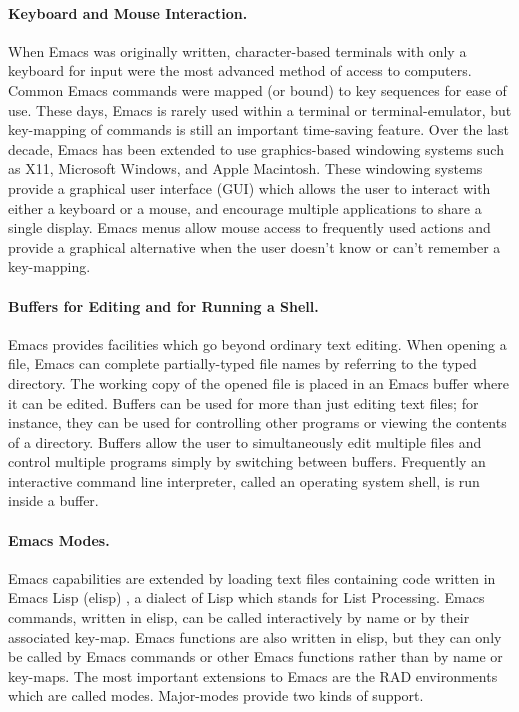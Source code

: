 \documentclass{article}
\begin{document}
\paragraph{Keyboard and Mouse Interaction.}
When Emacs was originally written, character-based terminals with only
a keyboard for input were the most advanced method of access to
computers.  Common Emacs commands were mapped (or bound) to key
sequences for ease of use.  These days, Emacs is
rarely used within a terminal or terminal-emulator, but key-mapping of
commands is still an important time-saving feature.  Over the last
decade, Emacs has been extended to use graphics-based windowing
systems such as X11, Microsoft Windows, and Apple Macintosh.  These
windowing systems provide a graphical user interface (GUI) which
allows the user to interact with either a keyboard or a mouse, and 
encourage multiple applications to share a single display.  Emacs 
menus allow mouse access to frequently used actions and provide a 
graphical alternative when the user doesn't know or can't remember 
a key-mapping.  

\paragraph{Buffers for Editing and for Running a Shell.}
Emacs provides facilities which go beyond ordinary text editing.  When
opening a file, Emacs can complete partially-typed file names by
referring to the typed directory.  The working copy of the opened file 
is placed in an Emacs buffer where it can be edited.  Buffers can be 
used for more than just editing text files; for instance, they can be 
used for controlling other programs or viewing the contents of a directory.  
Buffers allow the user to simultaneously edit multiple files and control 
multiple programs simply by switching between buffers.  Frequently an 
interactive command line interpreter, called an operating system shell, 
is run inside a buffer.

\paragraph{Emacs Modes.}
Emacs capabilities are extended by loading text files containing code
written in Emacs Lisp (elisp) \citep{RChassell1999}, a dialect of Lisp
\citep{PGraham:1996} which stands for List Processing.  Emacs commands, 
written in elisp, can be called interactively by name or by their associated 
key-map.  Emacs functions are also written in elisp, but they can only be 
called by Emacs commands or other Emacs functions rather than by
name or key-maps.  The most important extensions to Emacs are the RAD
environments which are called modes.  Major-modes provide two kinds of support.  
\end{document}

